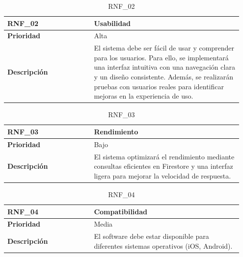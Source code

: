\begin{table}[htb!]
    \begin{tabular}{|p{0.35\linewidth}|p{0.6\linewidth}|}
        \hline
        \rowcolor[HTML]{C0C0C0}
        \textbf{RNF\_02} & \textbf{Usabilidad} \\
        \hline
        \textbf{Prioridad} & Alta \\
        \hline
        \textbf{Descripción} & 
        El sistema debe ser fácil de usar y comprender para los usuarios. 
        Para ello, se implementará una interfaz intuitiva con una navegación clara y un diseño consistente. 
        Además, se realizarán pruebas con usuarios reales para identificar mejoras en la experiencia de uso. \\
        \hline
    \end{tabular}
    \caption{RNF\_02}
\end{table}


\begin{table}[htb!]
    \begin{tabular}{|p{0.35\linewidth}|p{0.6\linewidth}|}
        \hline
        \rowcolor[HTML]{C0C0C0}
        \textbf{RNF\_03} & \textbf{Rendimiento} \\
        \hline
        \textbf{Prioridad} & Bajo \\
        \hline
        \textbf{Descripción} & 
        El sistema optimizará el rendimiento mediante consultas eficientes en Firestore y una interfaz ligera para mejorar la velocidad de respuesta. \\
        \hline
    \end{tabular}
    \caption{RNF\_03}
\end{table}



\begin{table}[htb!]
    \begin{tabular}{|p{0.35\linewidth}|p{0.6\linewidth}|}
        \hline
        \rowcolor[HTML]{C0C0C0}
        \textbf{RNF\_04} & \textbf{Compatibilidad} \\
        \hline
        \textbf{Prioridad} & Media \\
        \hline
        \textbf{Descripción} & El software debe estar disponible para diferentes sistemas operativos (iOS, Android). \\
        \hline
    \end{tabular}
    \label{req:RNF_04}
    \caption{RNF\_04}
\end{table}

